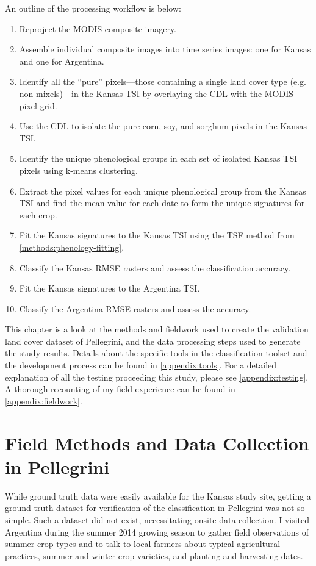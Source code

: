 An outline of the processing workflow is below:

\begin{Spacing}{1.2}
\begin{enumerate}
  \item Reproject the MODIS composite imagery.
  \item Assemble individual composite images into time series images: one for Kansas and one for Argentina.
  \item Identify all the ``pure'' pixels---those containing a single land cover type (e.g. non-mixels)---in the Kansas TSI by overlaying the CDL with the MODIS pixel grid.
  \item Use the CDL to isolate the pure corn, soy, and sorghum pixels in the Kansas TSI.
  \item Identify the unique phenological groups in each set of isolated Kansas TSI pixels using k-means clustering.
  \item Extract the pixel values for each unique phenological group from the Kansas TSI and find the mean value for each date to form the unique signatures for each crop.
  \item Fit the Kansas signatures to the Kansas TSI using the TSF method from \autoref{methods:phenology-fitting}.
  \item Classify the Kansas RMSE rasters and assess the classification accuracy.
  \item Fit the Kansas signatures to the Argentina TSI.
  \item Classify the Argentina RMSE rasters and assess the accuracy.
\end{enumerate}
\end{Spacing}

This chapter is a look at the methods and fieldwork used to create the validation land cover dataset of Pellegrini, and the data processing steps used to generate the study results. Details about the specific tools in the classification toolset and the development process can be found in \autoref{appendix:tools}. For a detailed explanation of all the testing proceeding this study, please see \autoref{appendix:testing}. A thorough recounting of my field experience can be found in \autoref{appendix:fieldwork}.


\section{Field Methods and Data Collection in Pellegrini}

While ground truth data were easily available for the Kansas study site, getting a ground truth dataset for verification of the classification in Pellegrini was not so simple. Such a dataset did not exist, necessitating onsite data collection. I visited Argentina during the summer 2014 growing season to gather field observations of summer crop types and to talk to local farmers about typical agricultural practices, summer and winter crop varieties, and planting and harvesting dates.

